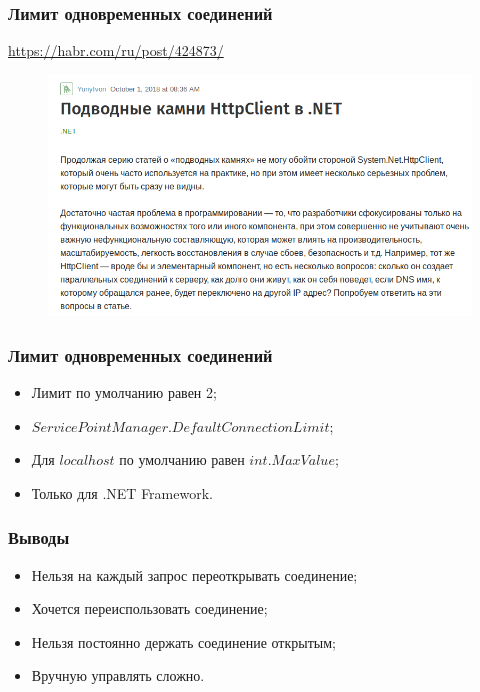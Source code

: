 \documentclass[17pt,aspectratio=169]{beamer}
\begin{document}
\begin{frame}
\frametitle{Лимит одновременных соединений}
\href{https://habr.com/ru/post/424873/}{https://habr.com/ru/post/424873/}
\begin{figure}
\includegraphics[scale=0.4]{habr}
\end{figure}
\end{frame}

\begin{frame}
\frametitle{Лимит одновременных соединений}
\begin{itemize}
	\item <1-> Лимит по умолчанию равен 2;
	\item <2-> $ServicePointManager.DefaultConnectionLimit$;
	\item <3-> Для $localhost$ по умолчанию равен $int.MaxValue$;
	\item <4-> Только для .NET Framework.
\end{itemize}
\end{frame}

\begin{frame}
\frametitle{Выводы}
\begin{itemize}
	\item <1-> Нельзя на каждый запрос переоткрывать соединение;
	\item <2-> Хочется переиспользовать соединение;
	\item <3-> Нельзя постоянно держать соединение открытым;
	\item <4-> Вручную управлять сложно.
\end{itemize}
\end{frame}
\end{document}
